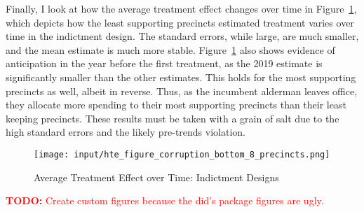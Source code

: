 Finally, I look at how the average treatment effect changes over time in Figure~\ref{fig:att_comparison_corruption_bottom}, which depicts how the least supporting precincts estimated treatment varies over time in the indictment design.
The standard errors, while large, are much smaller, and the mean estimate is much more stable.
Figure~\ref{fig:att_comparison_corruption_bottom} also shows evidence of anticipation in the year before the first treatment, as the 2019 estimate is significantly smaller than the other estimates.
This holds for the most supporting precincts as well, albeit in reverse.
Thus, as the incumbent alderman leaves office, they allocate more spending to their most supporting precincts than their least keeping precincts.
These results must be taken with a grain of salt due to the high standard errors and the likely pre-trends violation.

\begin{figure}[H]
    \centering
    \texttt{[image: input/hte\_figure\_corruption\_bottom\_8\_precincts.png]}
    \caption{Average Treatment Effect over Time: Indictment Designs}
    \label{fig:att_comparison_corruption_bottom}
\end{figure}

\textcolor{red}{\textbf{TODO:} Create custom figures because the did's package figures are ugly.}